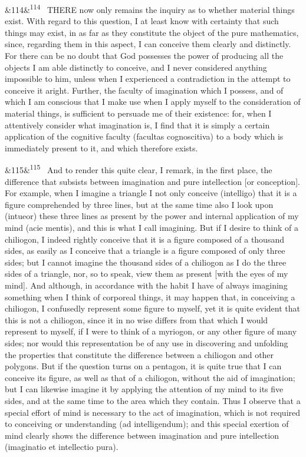 \documentclass[12pt]{article}
\newcommand{\para}[1][]{\par\noindent\ifx&#1&\else\textsuperscript{\footnotesize #1}~\fi}
\begin{document}
\para[114] THERE now only remains the inquiry as to whether material things exist. With regard to this question, I at least know with certainty that such things may exist, in as far as they constitute the object of the pure mathematics, since, regarding them in this aspect, I can conceive them clearly and distinctly. For there can be no doubt that God possesses the power of producing all the objects I am able distinctly to conceive, and I never considered anything impossible to him, unless when I experienced a contradiction in the attempt to conceive it aright. Further, the faculty of imagination which I possess, and of which I am conscious that I make use when I apply myself to the consideration of material things, is sufficient to persuade me of their existence: for, when I attentively consider what imagination is, I find that it is simply a certain application of the cognitive faculty (facultas cognoscitiva) to a body which is immediately present to it, and which therefore exists.

\para[115] And to render this quite clear, I remark, in the first place, the difference that subsists between imagination and pure intellection [or conception]. For example, when I imagine a triangle I not only conceive (intelligo) that it is a figure comprehended by three lines, but at the same time also I look upon (intueor) these three lines as present by the power and internal application of my mind (acie mentis), and this is what I call imagining. But if I desire to think of a chiliogon, I indeed rightly conceive that it is a figure composed of a thousand sides, as easily as I conceive that a triangle is a figure composed of only three sides; but I cannot imagine the thousand sides of a chiliogon as I do the three sides of a triangle, nor, so to speak, view them as present [with the eyes of my mind]. And although, in accordance with the habit I have of always imagining something when I think of corporeal things, it may happen that, in conceiving a chiliogon, I confusedly represent some figure to myself, yet it is quite evident that this is not a chiliogon, since it in no wise differs from that which I would represent to myself, if I were to think of a myriogon, or any other figure of many sides; nor would this representation be of any use in discovering and unfolding the properties that constitute the difference between a chiliogon and other polygons. But if the question turns on a pentagon, it is quite true that I can conceive its figure, as well as that of a chiliogon, without the aid of imagination; but I can likewise imagine it by applying the attention of my mind to its five sides, and at the same time to the area which they contain. Thus I observe that a special effort of mind is necessary to the act of imagination, which is not required to conceiving or understanding (ad intelligendum); and this special exertion of mind clearly shows the difference between imagination and pure intellection (imaginatio et intellectio pura).
\end{document}
